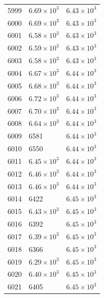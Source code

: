\begin{table}[H]
\begin{tabular}{lll}
5999 & $\displaystyle 6.69 \times 10^{3}$ & $\displaystyle 6.43 \times 10^{3}$ \\
6000 & $\displaystyle 6.69 \times 10^{3}$ & $\displaystyle 6.43 \times 10^{3}$ \\
6001 & $\displaystyle 6.58 \times 10^{3}$ & $\displaystyle 6.43 \times 10^{3}$ \\
6002 & $\displaystyle 6.59 \times 10^{3}$ & $\displaystyle 6.43 \times 10^{3}$ \\
6003 & $\displaystyle 6.58 \times 10^{3}$ & $\displaystyle 6.43 \times 10^{3}$ \\
6004 & $\displaystyle 6.67 \times 10^{3}$ & $\displaystyle 6.44 \times 10^{3}$ \\
6005 & $\displaystyle 6.68 \times 10^{3}$ & $\displaystyle 6.44 \times 10^{3}$ \\
6006 & $\displaystyle 6.72 \times 10^{3}$ & $\displaystyle 6.44 \times 10^{3}$ \\
6007 & $\displaystyle 6.70 \times 10^{3}$ & $\displaystyle 6.44 \times 10^{3}$ \\
6008 & $\displaystyle 6.64 \times 10^{3}$ & $\displaystyle 6.44 \times 10^{3}$ \\
6009 & 6581 & $\displaystyle 6.44 \times 10^{3}$ \\
6010 & 6550 & $\displaystyle 6.44 \times 10^{3}$ \\
6011 & $\displaystyle 6.45 \times 10^{3}$ & $\displaystyle 6.44 \times 10^{3}$ \\
6012 & $\displaystyle 6.46 \times 10^{3}$ & $\displaystyle 6.44 \times 10^{3}$ \\
6013 & $\displaystyle 6.46 \times 10^{3}$ & $\displaystyle 6.44 \times 10^{3}$ \\
6014 & 6422 & $\displaystyle 6.45 \times 10^{3}$ \\
6015 & $\displaystyle 6.43 \times 10^{3}$ & $\displaystyle 6.45 \times 10^{3}$ \\
6016 & 6392 & $\displaystyle 6.45 \times 10^{3}$ \\
6017 & $\displaystyle 6.39 \times 10^{3}$ & $\displaystyle 6.45 \times 10^{3}$ \\
6018 & 6366 & $\displaystyle 6.45 \times 10^{3}$ \\
6019 & $\displaystyle 6.29 \times 10^{3}$ & $\displaystyle 6.45 \times 10^{3}$ \\
6020 & $\displaystyle 6.40 \times 10^{3}$ & $\displaystyle 6.45 \times 10^{3}$ \\
6021 & 6405 & $\displaystyle 6.45 \times 10^{3}$ \\

\end{tabular}
\end{table}
